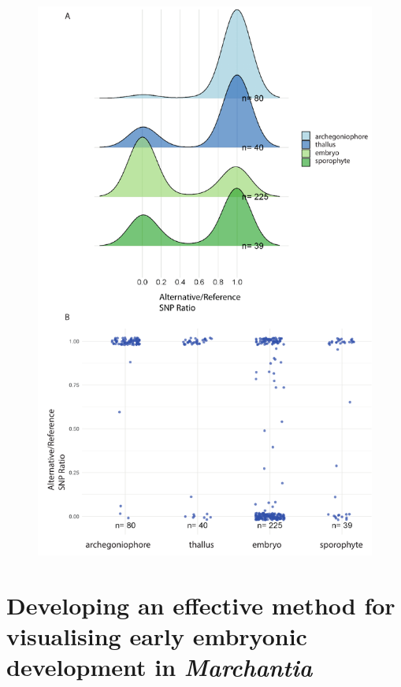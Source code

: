 \begin{figure}[htbp!] 
\centering    
    \includegraphics[width=1\textwidth]{Chapter3/Figs/Figure_sRNA_SNPs.pdf}
\caption{\textbf{}}
\label{fig:sRNA_SNPs}
\captionsetup{font=small}
    \caption*{}
\end{figure}

\clearpage

\section{Developing an effective method for visualising early embryonic development in \textit{Marchantia}}

